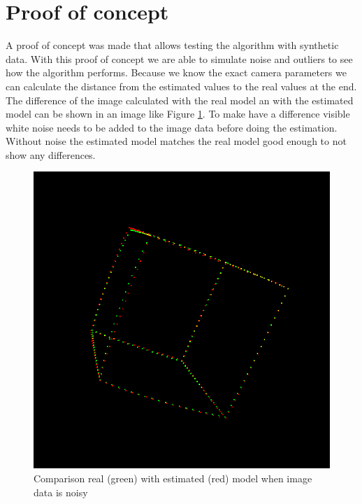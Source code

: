 \documentclass[11pt,a4paper,titlepage,oneside]{report}
\begin{document}
\section{Proof of concept}
A proof of concept was made that allows testing the algorithm with synthetic data. With this proof of concept we are able to simulate noise and outliers to see how the algorithm performs. Because we know the exact camera parameters we can calculate the distance from the estimated values to the real values at the end. The difference of the image calculated with the real model an with the estimated model can be shown in an image like Figure \ref{fig:diff_img}. To make have a difference visible white noise needs to be added to the image data before doing the estimation. Without noise the estimated model matches the real model good enough to not show any differences.
\begin{figure}[H]
  \begin{center}
		\includegraphics[width=1.0\textwidth]{img/diff_img.png}
  \end{center}
	\caption{Comparison real (green) with estimated (red) model when image data is noisy}\label{fig:diff_img}
\end{figure}
\end{document}
